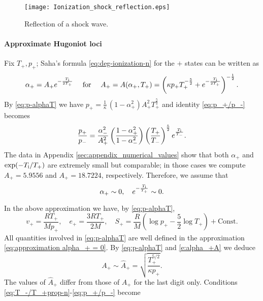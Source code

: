 \documentclass[10pt,a4paper]{article}
\numberwithin{equation}{section}
\newcommand{\Ti}{T_{\rm i}}
\begin{document}
\begin{figure}[hbt]
\centering
 \texttt{[image: Ionization\_shock\_reflection.eps]}
 \caption{Reflection of a shock wave.}\label{fig:shock reflection}
\end{figure}
\paragraph{Approximate Hugoniot loci}
Fix $T_+,p_+$; Saha's formula \eqref{eq:deg-ionization-n} for the $+$ states can be written as  
\begin{equation}\label{e:alpha_+A}
   \alpha_+ = A_+e^{-\frac{\Ti}{2T_{+}}}\quad \hbox{ for }\quad  A_+ = A(\alpha_+,T_+)=\left(\kappa p_{+} T_{+}^{-\frac{5}{2}} + e^{-\frac{\Ti}{2T_{+}}}\right)^{-\frac{1}{2}}.
\end{equation}
By  \eqref{eq:p-alphaT} we have $p_+= \frac1\kappa\,(1 - \alpha_+^2)A_+^2T_+^{\frac{5}{2}}$ and identity \eqref{eq:p_+/p_-} becomes
\begin{equation}\label{e:pA}
\frac{p_+}{p_-} 
= \frac{\alpha_-^2}{A_+^2}\left(\frac{1 - \alpha_+^2}{1 - \alpha_-^2}\right) \left(\frac{T_{+}}{T_{-}}\right)^{\frac{5}{2}} e^{\frac{\Ti}{T_{-}}}.
\end{equation}
The data in Appendix \ref{sec:appendix_numerical_values} show that both $\alpha_+$ and $\exp(-\Ti/T_{+})$ are extremely small but comparable; in those cases we compute $A_+ = 5.9556$ and $A_+ = 18.7224$, respectively. Therefore, we assume that
\begin{equation}\label{eq:approximation alpha_+ = 0}
  \alpha_+ \sim 0, \quad e^{-\frac{\Ti}{T_{+}}} \sim 0.
\end{equation}
%
\par\noindent
In the above approximation we have, by \eqref{eq:p-alphaT},
\begin{equation}\label{eq:v_+ e_+}
     v_+ = \frac{RT_+}{Mp_+}, \quad e_+ = \frac{3RT_+}{2M}, \quad
   S_+ = \frac{R}{M}\left(\log p_+ -\frac{5}{2}\log T_+ \right) + \text{Const.}
\end{equation}
All quantities involved in \eqref{eq:p-alphaT} are well defined in the approximation \eqref{eq:approximation alpha_+ = 0}.
By \eqref{eq:p-alphaT} and \eqref{e:alpha_+A} we deduce
\begin{equation}\label{e:hatA+}
A_+ \sim \widehat{A}_+ = \sqrt{\frac{T_{+}^{5/2}}{\kappa  p_{+}}}.
\end{equation}
The values of $\widehat{A}_+$ differ from those of $A_+$ for the last digit only. Conditions \eqref{eq:T_-/T_+prop-n}-\eqref{eq:p_+/p_-} become
\end{document}
